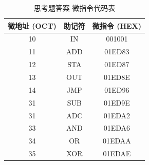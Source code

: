 \begin{enumerate}
    \begin{table}[H]
        \centering
        \begin{tabular}{|c|c|c|}
            \hline
            微地址 (OCT) & 助记符 & 微指令 (HEX) \\
            \hline
            10 & IN & 001001 \\
            \hline
            11 & ADD & 01ED83 \\
            \hline
            12 & STA & 01ED87 \\
            \hline
            13 & OUT & 01ED8E \\
            \hline
            14 & JMP & 01ED96 \\
            \hline
            31 & SUB & 01ED9E \\
            \hline
            31 & ADC & 01EDA2 \\
            \hline
            33 & AND & 01EDA6 \\
            \hline
            34 & OR & 01EDAA \\
            \hline
            35 & XOR & 01EDAE \\
            \hline
        \end{tabular}
        \caption{思考题答案 微指令代码表}
        \label{tab:ans6_1}
    \end{table}
    
\end{enumerate}

